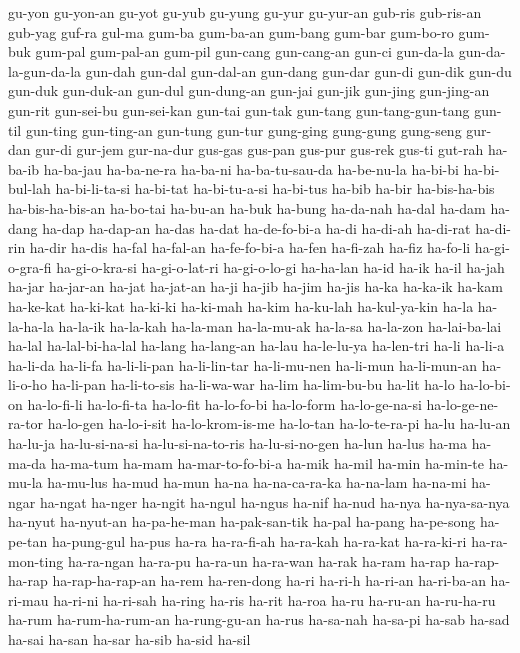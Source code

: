 {gu-yon gu-yon-an gu-yot gu-yub gu-yung gu-yur gu-yur-an gub-ris gub-ris-an
gub-yag guf-ra gul-ma gum-ba gum-ba-an gum-bang gum-bar gum-bo-ro gum-buk
gum-pal gum-pal-an gum-pil gun-cang gun-cang-an gun-ci gun-da-la
gun-da-la-gun-da-la gun-dah gun-dal gun-dal-an gun-dang gun-dar gun-di
gun-dik gun-du gun-duk gun-duk-an gun-dul gun-dung-an gun-jai gun-jik
gun-jing gun-jing-an gun-rit gun-sei-bu gun-sei-kan gun-tai gun-tak
gun-tang gun-tang-gun-tang gun-til gun-ting gun-ting-an gun-tung gun-tur
gung-ging gung-gung gung-seng gur-dan gur-di gur-jem gur-na-dur gus-gas
gus-pan gus-pur gus-rek gus-ti gut-rah ha-ba-ib ha-ba-jau ha-ba-ne-ra
ha-ba-ni ha-ba-tu-sau-da ha-be-nu-la ha-bi-bi ha-bi-bul-lah ha-bi-li-ta-si
ha-bi-tat ha-bi-tu-a-si ha-bi-tus ha-bib ha-bir ha-bis-ha-bis
ha-bis-ha-bis-an ha-bo-tai ha-bu-an ha-buk ha-bung ha-da-nah ha-dal ha-dam
ha-dang ha-dap ha-dap-an ha-das ha-dat ha-de-fo-bi-a ha-di ha-di-ah
ha-di-rat ha-di-rin ha-dir ha-dis ha-fal ha-fal-an ha-fe-fo-bi-a ha-fen
ha-fi-zah ha-fiz ha-fo-li ha-gi-o-gra-fi ha-gi-o-kra-si ha-gi-o-lat-ri
ha-gi-o-lo-gi ha-ha-lan ha-id ha-ik ha-il ha-jah ha-jar ha-jar-an ha-jat
ha-jat-an ha-ji ha-jib ha-jim ha-jis ha-ka ha-ka-ik ha-kam ha-ke-kat
ha-ki-kat ha-ki-ki ha-ki-mah ha-kim ha-ku-lah ha-kul-ya-kin ha-la
ha-la-ha-la ha-la-ik ha-la-kah ha-la-man ha-la-mu-ak ha-la-sa ha-la-zon
ha-lai-ba-lai ha-lal ha-lal-bi-ha-lal ha-lang ha-lang-an ha-lau
ha-le-lu-ya ha-len-tri ha-li ha-li-a ha-li-da ha-li-fa ha-li-li-pan
ha-li-lin-tar ha-li-mu-nen ha-li-mun ha-li-mun-an ha-li-o-ho ha-li-pan
ha-li-to-sis ha-li-wa-war ha-lim ha-lim-bu-bu ha-lit ha-lo ha-lo-bi-on
ha-lo-fi-li ha-lo-fi-ta ha-lo-fit ha-lo-fo-bi ha-lo-form ha-lo-ge-na-si
ha-lo-ge-ne-ra-tor ha-lo-gen ha-lo-i-sit ha-lo-krom-is-me ha-lo-tan
ha-lo-te-ra-pi ha-lu ha-lu-an ha-lu-ja ha-lu-si-na-si ha-lu-si-na-to-ris
ha-lu-si-no-gen ha-lun ha-lus ha-ma ha-ma-da ha-ma-tum ha-mam
ha-mar-to-fo-bi-a ha-mik ha-mil ha-min ha-min-te ha-mu-la ha-mu-lus ha-mud
ha-mun ha-na ha-na-ca-ra-ka ha-na-lam ha-na-mi ha-ngar ha-ngat ha-nger
ha-ngit ha-ngul ha-ngus ha-nif ha-nud ha-nya ha-nya-sa-nya ha-nyut
ha-nyut-an ha-pa-he-man ha-pak-san-tik ha-pal ha-pang ha-pe-song ha-pe-tan
ha-pung-gul ha-pus ha-ra ha-ra-fi-ah ha-ra-kah ha-ra-kat ha-ra-ki-ri
ha-ra-mon-ting ha-ra-ngan ha-ra-pu ha-ra-un ha-ra-wan ha-rak ha-ram ha-rap
ha-rap-ha-rap ha-rap-ha-rap-an ha-rem ha-ren-dong ha-ri ha-ri-h ha-ri-an
ha-ri-ba-an ha-ri-mau ha-ri-ni ha-ri-sah ha-ring ha-ris ha-rit ha-roa
ha-ru ha-ru-an ha-ru-ha-ru ha-rum ha-rum-ha-rum-an ha-rung-gu-an ha-rus
ha-sa-nah ha-sa-pi ha-sab ha-sad ha-sai ha-san ha-sar ha-sib ha-sid ha-sil
}
